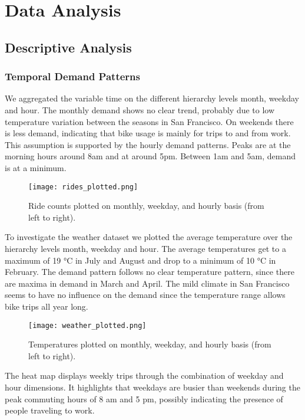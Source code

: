 \section{Data Analysis}

\subsection{Descriptive Analysis}
\subsubsection{Temporal Demand Patterns} 

We aggregated the variable time on the different hierarchy levels month, weekday and hour. The monthly demand shows no clear trend, probably due to low temperature variation between the seasons in San Francisco. On weekends there is less demand, indicating that bike usage is mainly for trips to and from work. This assumption is supported by the hourly demand patterns. Peaks are at the morning hours around 8am and at around 5pm. Between 1am and 5am, demand is at a minimum. 

\begin{figure}[hbtp]
    \texttt{[image: rides\_plotted.png]}
    \caption{Ride counts plotted on monthly, weekday, and hourly basis (from left to right).}
\end{figure}

To investigate the weather dataset we plotted the average temperature over the hierarchy levels month, weekday and hour. The average temperatures get to a maximum of 19 °C in July and August and drop to a minimum of 10 °C in February. The demand pattern follows no clear temperature pattern, since there are maxima in demand in March and April. The mild climate in San Francisco seems to have no influence on the demand since the temperature range allows bike trips all year long.

\begin{figure}[hbtp]
    \texttt{[image: weather\_plotted.png]}
    \caption{Temperatures plotted on monthly, weekday, and hourly basis (from left to right).}
\end{figure}

The heat map displays weekly trips through the combination of weekday and hour dimensions. It highlights that weekdays are busier than weekends during the peak commuting hours of 8 am and 5 pm, possibly indicating the presence of people traveling to work.

